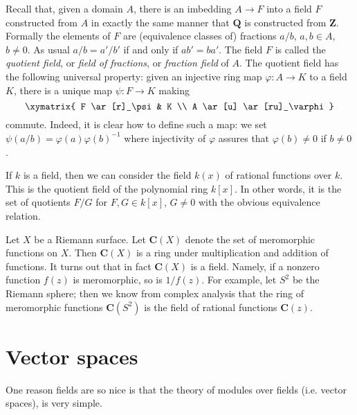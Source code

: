 \begin{example}
\label{example-quotient-field}
Recall that, given a domain $A$, there is an imbedding $A \to F$ into a
field $F$ constructed from $A$ in exactly the same manner that
$\mathbf{Q}$ is constructed from $\mathbf{Z}$. Formally the elements
of $F$ are (equivalence classes of) fractions $a/b$,
$a, b \in A$, $b \not = 0$. As usual $a/b = a'/b'$ if and only if $ab' = ba'$.
The field $F$ is called the {\it quotient field}, or {\it field of fractions},
or {\it fraction field} of $A$.
The quotient field has the following universal property: given an
injective ring map $\varphi : A \to K$ to a field $K$, there is a unique
map $\psi : F \to K$ making
$$
\xymatrix{
F \ar[r]_\psi & K \\
A \ar[u] \ar[ru]_\varphi
}
$$
commute. Indeed, it is clear how to define such a map: we set
$\psi(a/b) = \varphi(a)\varphi(b)^{-1}$ where injectivity of $\varphi$
assures that $\varphi(b) \not = 0$ if $ b \not = 0$.
\end{example}

\begin{example}
\label{example-field-of-rational-functions}
If $k$ is a field, then we can consider the field $k(x)$ of rational
functions over $k$. This is the quotient field of the polynomial ring
$k[x]$. In other words, it is the set of quotients $F/G$ for
$F, G \in k[x]$, $G \not = 0$ with the obvious equivalence relation.
\end{example}

\begin{example}
\label{example-field-of-meromorphic-functions}
Let $X$ be a Riemann surface. Let $\mathbf{C}(X)$ denote the
set of meromorphic functions on $X$. Then $\mathbf{C}(X)$ is a ring under
multiplication and addition of functions. It turns out that in fact
$\mathbf{C}(X)$ is a field. Namely, if a nonzero function $f(z)$ is
meromorphic, so is $1/f(z)$. For example, let $S^2$ be the Riemann
sphere; then we know from complex analysis that the ring of meromorphic
functions $\mathbf{C}(S^2)$ is the field of rational functions $\mathbf{C}(z)$.
\end{example}



\section{Vector spaces}
\label{section-vector-spaces}

\noindent
One reason fields are so nice is that the theory of modules over fields
(i.e. vector spaces), is very simple.

